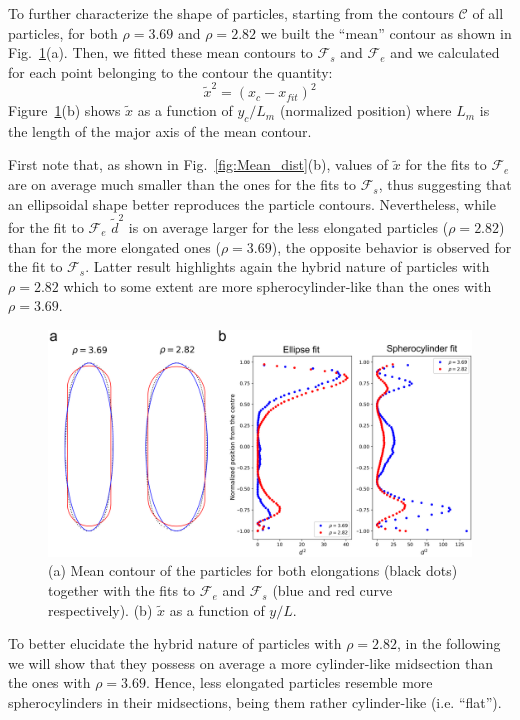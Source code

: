 \documentclass[aip,graphicx]{revtex4-1} %
\begin{document}
To further characterize the shape of particles, starting from the contours $\mathcal{C}$ of all particles, for both $\rho=3.69$
and $\rho=2.82$ we built the ``mean'' contour as shown in Fig.~\ref{fig:Mean_bord}(a).
Then, we fitted these mean contours to $\mathcal{F}_s$ and $\mathcal{F}_e$ and we calculated for each point belonging to the 
contour the quantity:
\begin{equation}
  \widetilde{x}^2 = {(x_c - x_{fit})}^2 
\end{equation}
Figure~\ref{fig:Mean_bord}(b) shows $\widetilde{x}$ as a function of $y_c/L_m$ (normalized position) where $L_m$ is the 
length of the major axis of the mean contour.

First note that, as shown in Fig.~\ref{fig:Mean_dist}(b), values of $\widetilde{x}$ for the fits to $\mathcal{F}_e$ 
are on average much smaller than the ones for the fits to $\mathcal{F}_s$, thus suggesting that an ellipsoidal shape better reproduces
the particle contours. Nevertheless, while for the fit to $\mathcal{F}_e$ $\widetilde{d}^2$ is on average larger for the less elongated 
particles ($\rho=2.82$) than for the more elongated ones ($\rho=3.69$), the opposite behavior is observed for the fit 
to $\mathcal{F}_s$. Latter result highlights again the hybrid nature of particles with $\rho=2.82$ which to some extent are more
spherocylinder-like than the ones with $\rho=3.69$.

\begin{figure}
    \centering
    \includegraphics[width=0.7\columnwidth]{Mean_bord.png}
\caption{(a) Mean contour of the particles for both elongations (black dots) together with the fits to $\mathcal{F}_e$ and 
$\mathcal{F}_s$ (blue and red curve respectively). (b) $\widetilde{x}$ as a function of $y/L$.}\label{fig:Mean_bord}
\end{figure}

To better elucidate the hybrid nature of particles with $\rho=2.82$, in the following we will show that they
possess on average a more cylinder-like midsection than the ones with $\rho=3.69$. 
Hence, less elongated particles resemble more spherocylinders in their midsections, being them rather cylinder-like (i.e. ``flat'').
\end{document}
